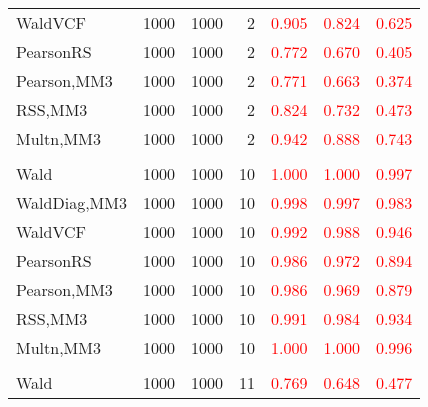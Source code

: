 \documentclass[
]{article}
\begin{document}
\begin{table}[H]
{\begin{tabular}[t]{lrrrrrr}
\hspace{1em}WaldVCF & 1000 & 1000 & 2 & \textcolor{red}{0.905} & \textcolor{red}{0.824} & \textcolor{red}{0.625}\\
\hspace{1em}PearsonRS & 1000 & 1000 & 2 & \textcolor{red}{0.772} & \textcolor{red}{0.670} & \textcolor{red}{0.405}\\
\hspace{1em}Pearson,MM3 & 1000 & 1000 & 2 & \textcolor{red}{0.771} & \textcolor{red}{0.663} & \textcolor{red}{0.374}\\
\hspace{1em}RSS,MM3 & 1000 & 1000 & 2 & \textcolor{red}{0.824} & \textcolor{red}{0.732} & \textcolor{red}{0.473}\\
\hspace{1em}Multn,MM3 & 1000 & 1000 & 2 & \textcolor{red}{0.942} & \textcolor{red}{0.888} & \textcolor{red}{0.743}\\
\addlinespace[0.3em]
\multicolumn{7}{l}{\textbf{1F 15V}}\\
\hspace{1em}Wald & 1000 & 1000 & 10 & \textcolor{red}{1.000} & \textcolor{red}{1.000} & \textcolor{red}{0.997}\\
\hspace{1em}WaldDiag,MM3 & 1000 & 1000 & 10 & \textcolor{red}{0.998} & \textcolor{red}{0.997} & \textcolor{red}{0.983}\\
\hspace{1em}WaldVCF & 1000 & 1000 & 10 & \textcolor{red}{0.992} & \textcolor{red}{0.988} & \textcolor{red}{0.946}\\
\hspace{1em}PearsonRS & 1000 & 1000 & 10 & \textcolor{red}{0.986} & \textcolor{red}{0.972} & \textcolor{red}{0.894}\\
\hspace{1em}Pearson,MM3 & 1000 & 1000 & 10 & \textcolor{red}{0.986} & \textcolor{red}{0.969} & \textcolor{red}{0.879}\\
\hspace{1em}RSS,MM3 & 1000 & 1000 & 10 & \textcolor{red}{0.991} & \textcolor{red}{0.984} & \textcolor{red}{0.934}\\
\hspace{1em}Multn,MM3 & 1000 & 1000 & 10 & \textcolor{red}{1.000} & \textcolor{red}{1.000} & \textcolor{red}{0.996}\\
\addlinespace[0.3em]
\multicolumn{7}{l}{\textbf{2F 10V}}\\
\hspace{1em}Wald & 1000 & 1000 & 11 & \textcolor{red}{0.769} & \textcolor{red}{0.648} & \textcolor{red}{0.477}\\

\end{tabular}}
\end{table}
\end{document}
